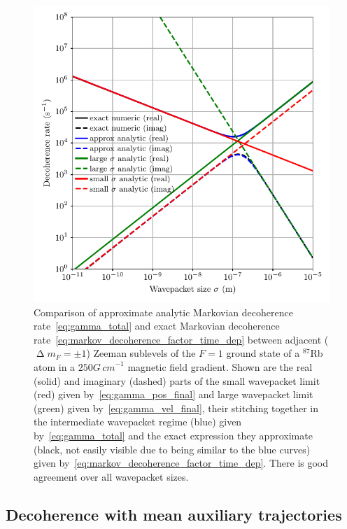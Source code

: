 \begin{figure}[t]
    \centerfloat
    \includegraphics{figures/hidden_variables/decoherence_rate_example.pdf}
    \caption{Comparison of approximate analytic Markovian decoherence rate~\eqref{eq:gamma_total} and exact Markovian decoherence rate~\eqref{eq:markov_decoherence_factor_time_dep} between adjacent ($\upDelta m_F = \pm 1$) Zeeman sublevels of the $F=1$ ground state of a $^{87}$Rb atom in a $250\unit{G\,cm}^{-1}$ magnetic field gradient. Shown are the real (solid) and imaginary (dashed) parts of the small wavepacket limit (red) given by~\eqref{eq:gamma_pos_final} and large wavepacket limit (green) given by~\eqref{eq:gamma_vel_final}, their stitching together in the intermediate wavepacket regime (blue) given by~\eqref{eq:gamma_total} and the exact expression they approximate (black, not easily visible due to being similar to the blue curves) given by~\eqref{eq:markov_decoherence_factor_time_dep}. There is good agreement over all wavepacket sizes.}\label{fig:decoherence_rate_example}
\end{figure}

\subsection{Decoherence with mean auxiliary trajectories}\label{sec:spawned_trajectories}

